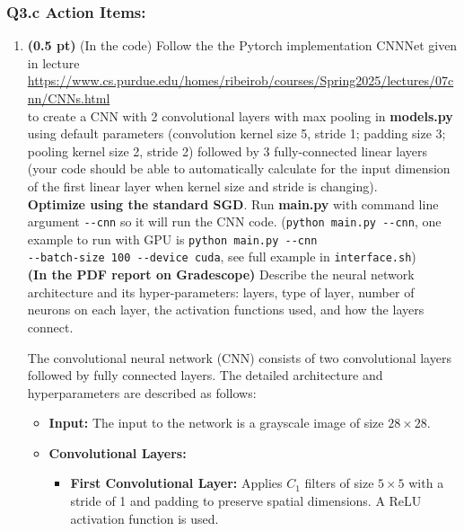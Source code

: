 \newpage
\subsubsection*{Q3.c Action Items:}
\begin{enumerate}


\item {\bf (0.5 pt)} (In the code) Follow the  the Pytorch implementation CNNNet given in lecture\\
{\small \url{https://www.cs.purdue.edu/homes/ribeirob/courses/Spring2025/lectures/07cnn/CNNs.html}}\\
to create a CNN with 2 convolutional layers with max pooling in {\bf models.py} using default parameters (convolution kernel size 5, stride 1; padding size 3; pooling kernel size 2, stride 2) followed by 3 fully-connected linear layers (your code should be able to automatically calculate for the input dimension of the first linear layer when kernel size and stride is changing).\\
{\bf Optimize using the standard SGD}. 
Run {\bf main.py} with command line argument \verb|--cnn| so it will run the CNN code. (\verb|python main.py --cnn|, one example to run with GPU is \verb|python main.py --cnn|\\ \verb|--batch-size 100 --device cuda|, see full example in \texttt{interface.sh}) \\
{\bf (In the PDF report on Gradescope)} 
Describe the neural network architecture and its hyper-parameters: layers, type of layer, number of neurons on each layer, the activation functions used, and how the layers connect. 

The convolutional neural network (CNN) consists of two convolutional layers 
followed by fully connected layers. The detailed architecture and hyperparameters are 
described as follows:

\begin{itemize}
    \item \textbf{Input:} The input to the network is a grayscale image of size 
    \(28 \times 28\).
    
    \item \textbf{Convolutional Layers:} 
    \begin{itemize}
        \item \textbf{First Convolutional Layer:} Applies \(C_1\) filters of 
        size \(5 \times 5\) with a stride of 1 and padding to preserve spatial 
        dimensions. A ReLU activation function is used.
        

\end{itemize}
\end{itemize}
\end{enumerate}
